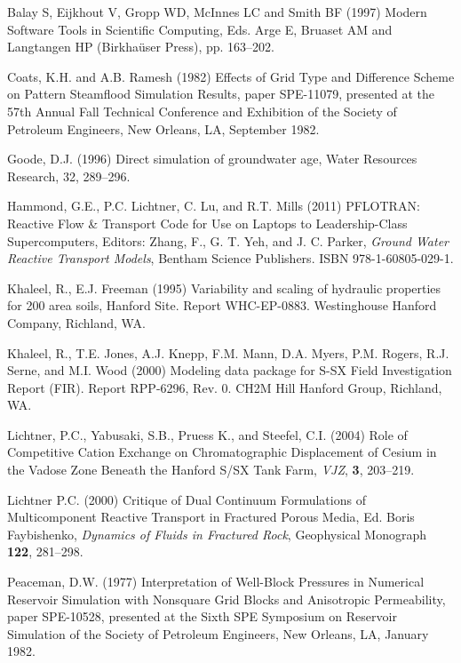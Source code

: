 \documentclass[12pt]{article}
\begin{document}
\begin{description}

\item Balay S, Eijkhout V, Gropp WD, McInnes LC and Smith BF (1997) Modern Software Tools in Scientific Computing, Eds. Arge E, Bruaset AM and Langtangen HP (Birkha\"user Press), pp. 163--202.

\item Coats, K.H. and A.B. Ramesh (1982) Effects of Grid Type and Difference Scheme on Pattern Steamflood Simulation Results, paper SPE-11079, presented at the 57th Annual Fall Technical Conference and Exhibition of the Society of Petroleum Engineers, New Orleans, LA, September 1982.

\item Goode, D.J. (1996) Direct simulation of groundwater age, Water Resources Research, 32, 289--296.

\item Hammond, G.E., P.C. Lichtner, C. Lu, and R.T. Mills (2011) PFLOTRAN: Reactive Flow \& Transport Code for Use on Laptops to Leadership-Class Supercomputers, Editors: Zhang, F., G. T. Yeh, and J. C. Parker, {\em Ground Water Reactive Transport Models}, Bentham Science Publishers. ISBN 978-1-60805-029-1. 

\item Khaleel, R., E.J. Freeman (1995) Variability and scaling of hydraulic properties for 200 area soils, Hanford Site. Report WHC-EP-0883. Westinghouse Hanford Company, Richland, WA.

\item Khaleel, R., T.E. Jones, A.J. Knepp, F.M. Mann, D.A. Myers, P.M. Rogers, R.J. Serne, and M.I. Wood (2000) Modeling data package for S-SX Field Investigation Report (FIR). Report RPP-6296, Rev. 0. CH2M Hill Hanford Group, Richland, WA.

\item Lichtner, P.C., Yabusaki, S.B., Pruess K., and Steefel, C.I. (2004) Role of Competitive Cation Exchange on Chromatographic Displacement of Cesium in the Vadose Zone Beneath the Hanford S/SX Tank Farm, {\em VJZ}, {\bf 3}, 203--219.

\item Lichtner P.C. (2000)  Critique of Dual Continuum Formulations of Multicomponent Reactive Transport in Fractured Porous Media, Ed. Boris Faybishenko, {\em Dynamics of Fluids in Fractured Rock}, Geophysical Monograph {\bf 122}, 281--298.

\item Peaceman, D.W. (1977) Interpretation of Well-Block Pressures in Numerical Reservoir Simulation with Nonsquare Grid Blocks and Anisotropic Permeability, paper SPE-10528, presented at the Sixth SPE Symposium on Reservoir Simulation of the Society of Petroleum Engineers, New Orleans, LA, January 1982.  


\end{description}
\end{document}
